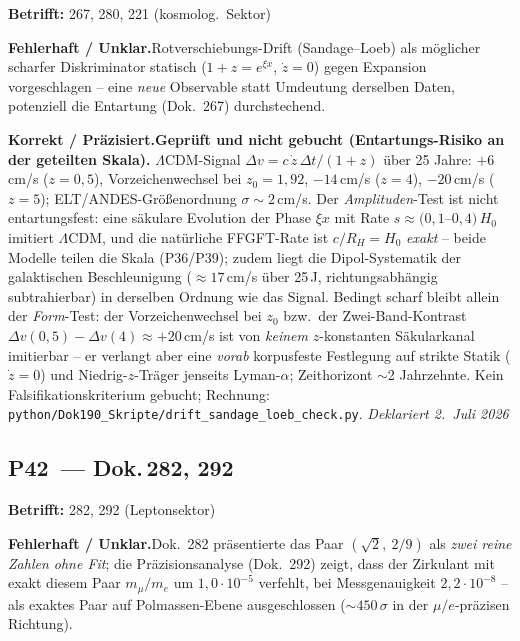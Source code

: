 \noindent\textbf{Betrifft:} 267, 280, 221 (kosmolog.\ Sektor)


\smallskip\noindent\textbf{Fehlerhaft / Unklar.}\quad Rotverschiebungs-Drift (Sandage--Loeb) als möglicher scharfer Diskriminator statisch ($1+z=e^{\xi x}$, $\dot z=0$) gegen Expansion vorgeschlagen -- eine \emph{neue} Observable statt Umdeutung derselben Daten, potenziell die Entartung (Dok.~267) durchstechend.


\smallskip\noindent\textbf{Korrekt / Präzisiert.}\quad \textbf{Geprüft und nicht gebucht (Entartungs-Risiko an der geteilten Skala).} $\Lambda$CDM-Signal $\Delta v=c\,\dot z\,\Delta t/(1+z)$ über 25 Jahre: $+6$\,cm/s ($z{=}0{,}5$), Vorzeichenwechsel bei $z_0=1{,}92$, $-14$\,cm/s ($z{=}4$), $-20$\,cm/s ($z{=}5$); ELT/ANDES-Größenordnung $\sigma\sim2$\,cm/s. Der \emph{Amplituden}-Test ist nicht entartungsfest: eine säkulare Evolution der Phase $\xi x$ mit Rate $s\approx(0{,}1$--$0{,}4)\,H_0$ imitiert $\Lambda$CDM, und die natürliche FFGFT-Rate ist $c/R_H=H_0$ \emph{exakt} -- beide Modelle teilen die Skala (P36/P39); zudem liegt die Dipol-Systematik der galaktischen Beschleunigung ($\approx17$\,cm/s über 25\,J, richtungsabhängig subtrahierbar) in derselben Ordnung wie das Signal. Bedingt scharf bleibt allein der \emph{Form}-Test: der Vorzeichenwechsel bei $z_0$ bzw.\ der Zwei-Band-Kontrast $\Delta v(0{,}5)-\Delta v(4)\approx+20$\,cm/s ist von \emph{keinem} $z$-konstanten Säkularkanal imitierbar -- er verlangt aber eine \emph{vorab} korpusfeste Festlegung auf strikte Statik ($\dot z=0$) und Niedrig-$z$-Träger jenseits Lyman-$\alpha$; Zeithorizont $\sim$2 Jahrzehnte. Kein Falsifikationskriterium gebucht; Rechnung: \texttt{python/Dok190\_Skripte/drift\_sandage\_loeb\_check.py}. \emph{Deklariert 2.~Juli 2026}


\medskip


\subsection*{P42~--- Dok.\,282, 292}

\noindent\textbf{Betrifft:} 282, 292 (Leptonsektor)


\smallskip\noindent\textbf{Fehlerhaft / Unklar.}\quad Dok.~282 präsentierte das Paar $(\sqrt2,\ 2/9)$ als \emph{zwei reine Zahlen ohne Fit}; die Präzisionsanalyse (Dok.~292) zeigt, dass der Zirkulant mit exakt diesem Paar $m_\mu/m_e$ um $1{,}0\cdot10^{-5}$ verfehlt, bei Messgenauigkeit $2{,}2\cdot10^{-8}$ -- als exaktes Paar auf Polmassen-Ebene ausgeschlossen ($\sim450\,\sigma$ in der $\mu/e$-präzisen Richtung).


